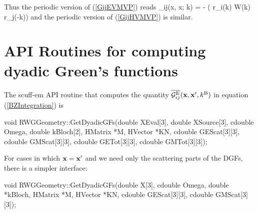 \documentclass[letterpaper]{article}
\newcommand{\iD}{_{i\text{\tiny D}}}
\newcommand{\jS}{_{j\text{\tiny S}}}
\begin{document}
Thus the periodic version of (\ref{GijEVMVP}) reads
{
 _{ij}(\vb x, \vb x; \vb k)
= -
   \Big( \vb r\iD{}(\vb k) 
              \cdot \vb W(\vb k) 
   \cdot \vb r\jS{}(-\vb k)\Big)
}
and the periodic version of (\ref{GijHVMVP}) is similar.

\newpage
\section{API Routines for computing dyadic Green's functions}

The {\sc scuff-em} API routine that computes the quantity
$\overline{\mathcal{G}^{\text{\scriptsize E}}_{ij}}(\mathbf{x}, \mathbf{x}^\prime, k^{\text{\scriptsize B}})$
in equation (\ref{BZIntegration}) is 

\smallskip 
\begin{center}
\begin{verbcode}
void RWGGeometry::GetDyadicGFs(double XEval[3], double XSource[3],
                               cdouble Omega, double kBloch[2],
                               HMatrix *M, HVector *KN,
                               cdouble GEScat[3][3],
                               cdouble GMScat[3][3],
                               cdouble GETot[3][3],
                               cdouble GMTot[3][3]);
\end{verbcode}
\end{center}
\smallskip

For cases in which $\mathbf{x}=\mathbf{x}^\prime$ and we need only the 
scattering parts of the DGFs, there is a simpler interface:

\smallskip 
\begin{center}
\begin{verbcode}
void RWGGeometry::GetDyadicGFs(double X[3], cdouble Omega, 
                               double *kBloch,
                               HMatrix *M, HVector *KN,
                               cdouble GEScat[3][3], 
                               cdouble GMScat[3][3]);
\end{verbcode}
\end{center}
\smallskip 
\end{document}
